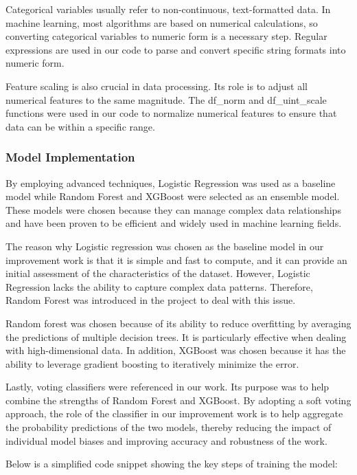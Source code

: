 \documentclass[conference]{IEEEtran}
\begin{document}
Categorical variables usually refer to non-continuous, text-formatted data. In machine learning, most algorithms are based on numerical calculations, so converting categorical variables to numeric form is a necessary step. Regular expressions are used in our code to parse and convert specific string formats into numeric form.

Feature scaling is also crucial in data processing. Its role is to adjust all numerical features to the same magnitude. The df\_norm and df\_uint\_scale functions were used in our code to normalize numerical features to ensure that data can be within a specific range.



\subsubsection{Model Implementation}

By employing advanced techniques, Logistic Regression was used as a baseline model while Random Forest and XGBoost were selected as an ensemble model. These models were chosen because they can manage complex data relationships and have been proven to be efficient and widely used in machine learning fields.

The reason why Logistic regression was chosen as the baseline model in our improvement work is that it is simple and fast to compute, and it can provide an initial assessment of the characteristics of the dataset. However, Logistic Regression lacks the ability to capture complex data patterns. Therefore, Random Forest was introduced in the project to deal with this issue. 

Random forest was chosen because of its ability to reduce overfitting by averaging the predictions of multiple decision trees. It is particularly effective when dealing with high-dimensional data. In addition, XGBoost was chosen because it has the ability to  leverage gradient boosting to iteratively minimize the error.

Lastly, voting classifiers were referenced in our work. Its purpose was to help combine the strengths of Random Forest and XGBoost. By adopting a soft voting approach, the role of the classifier in our improvement work is to help aggregate the probability predictions of the two models, thereby reducing the impact of individual model biases and improving accuracy and robustness of  the work.

Below is a simplified code snippet showing the key steps of training the model:
\end{document}
